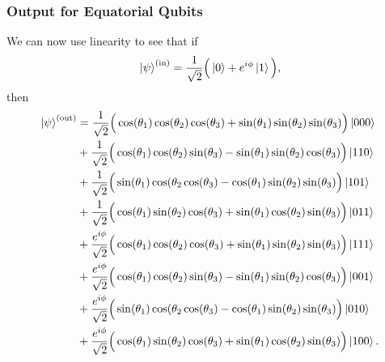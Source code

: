 \documentclass[reqno]{amsart}
\numberwithin{lemma}{section}
\numberwithin{proposition}{section}
\newcommand{\out}{\textnormal{out}}
\begin{document}
{\subsubsection{Output for Equatorial Qubits} We can now use linearity to see that if 
\begin{equation*}
\ket{\psi}^{(\textnormal{in})} = \frac{1}{\sqrt{2}} \Big ( \ket{0} + e^{i\phi} \ket{1} \Big ),
\end{equation*}
then
\begin{equation}
\label{equatorial_output}
\begin{aligned}
\ket{\psi}^{(\out)} &= \frac{1}{\sqrt{2}} \Big ( \cos(\theta_{1}) \cos(\theta_{2}) \cos(\theta_{3}) + \sin(\theta_{1}) \sin(\theta_{2}) \sin(\theta_{3}) \Big ) \ket{000}\\
& + \frac{1}{\sqrt{2}} \Big (\cos(\theta_{1}) \cos(\theta_{2}) \sin(\theta_{3}) - \sin(\theta_{1}) \sin(\theta_{2}) \cos(\theta_{3}) \Big ) \ket{110}\\
& + \frac{1}{\sqrt{2}} \Big ( \sin(\theta_{1}) \cos(\theta_{2} \cos(\theta_{3}) - \cos(\theta_{1}) \sin(\theta_{2}) \sin(\theta_{3}) \Big ) \ket{101}\\
& + \frac{1}{\sqrt{2}}\Big ( \cos(\theta_{1}) \sin(\theta_{2}) \cos(\theta_{3}) + \sin(\theta_{1}) \cos(\theta_{2}) \sin(\theta_{3}) \Big ) \ket{011}\\
& + \frac{e^{i\phi}}{\sqrt{2}} \Big ( \cos(\theta_{1}) \cos(\theta_{2}) \cos(\theta_{3}) + \sin(\theta_{1}) \sin(\theta_{2}) \sin(\theta_{3}) \Big ) \ket{111}\\
& + \frac{e^{i\phi}}{\sqrt{2}} \Big ( \cos(\theta_{1}) \cos(\theta_{2}) \sin(\theta_{3}) - \sin(\theta_{1}) \sin(\theta_{2}) \cos(\theta_{3}) \Big ) \ket{001}\\
& + \frac{e^{i\phi}}{\sqrt{2}} \Big ( \sin(\theta_{1}) \cos(\theta_{2} \cos(\theta_{3}) - \cos(\theta_{1}) \sin(\theta_{2}) \sin(\theta_{3}) \Big ) \ket{010}\\
& + \frac{e^{i\phi}}{\sqrt{2}} \Big ( \cos(\theta_{1}) \sin(\theta_{2}) \cos(\theta_{3}) + \sin(\theta_{1}) \cos(\theta_{2}) \sin(\theta_{3}) \Big ) \ket{100}.
\end{aligned}
\end{equation}

}
\end{document}
